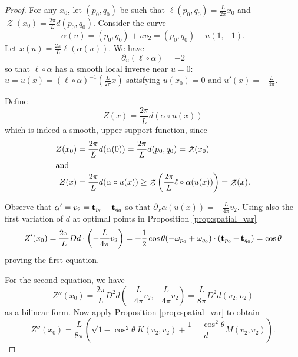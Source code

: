 \documentclass[11pt]{amsart}
\DeclareMathOperator{\chordarcprofile}{\mathcal{Z}}
\begin{document}
\begin{proof}
For any $x_0$, let $(p_0,q_0)$ be such that $\ell(p_0,q_0) = \tfrac{L}{2\pi} x_0$ and $\chordarcprofile(x_0) = \tfrac{2\pi}{L} d(p_0,q_0)$. Consider the curve
\[
\alpha(u) = (p_0, q_0) + uv_2 = (p_0, q_0) + u(1,-1).
\]
Let \(x(u) = \tfrac{2\pi}{L} \ell(\alpha(u))\). We have
\[
\partial_u (\ell \circ \alpha) = -2
\]
so that $\ell\circ\alpha$ has a smooth local inverse near $u=0$: \(u = u(x) = (\ell \circ \alpha)^{-1}(\tfrac{L}{2\pi} x)\) satisfying \(u(x_0) = 0\) and \(u'(x) = -\tfrac{L}{4\pi}\).

Define
\[
Z(x) = \frac{2\pi}{L} d(\alpha \circ u (x))
\]
which is indeed a smooth, upper support function, since
\begin{align*}
Z(x_0) &= \frac{2\pi}{L} d(\alpha(0)) = \frac{2\pi}{L} d(p_0, q_0) = \chordarcprofile(x_0) \\
\intertext{and}
Z(x) &= \frac{2\pi}{L} d(\alpha \circ u(x)) \geq \chordarcprofile \left(\frac{2\pi}{L}\ell\circ\alpha(u(x))\right) = \chordarcprofile(x).
\end{align*}

Observe that $\alpha' = v_2 = \operatorname{\mathbf{t}}_{p_0} - \operatorname{\mathbf{t}}_{q_0}$ so that \(\partial_x \alpha(u(x)) = -\tfrac{L}{4\pi} v_2\). Using also the first variation of $d$ at optimal points in Proposition \ref{prop:spatial_var}
\[
Z'(x_0) = \frac{2\pi}{L} Dd \cdot \left(-\frac{L}{4\pi}v_2\right) = -\frac{1}{2} \cos\theta (-\omega_{p_0} + \omega_{q_0}) \cdot (\operatorname{\mathbf{t}}_{p_0} - \operatorname{\mathbf{t}}_{q_0}) = \cos\theta
\]
proving the first equation.

For the second equation, we have
\[
Z''(x_0) = \frac{2\pi}{L} D^2 d \left(-\frac{L}{4\pi} v_2, -\frac{L}{4\pi} v_2\right) = \frac{L}{8\pi} D^2 d (v_2, v_2)
\]
as a bilinear form. Now apply Proposition \ref{prop:spatial_var} to obtain
\begin{equation}
\label{eq:barrier_secondvar}
Z''(x_0) = \frac{L}{8\pi} \left(\sqrt{1-\cos^2\theta} K (v_2, v_2) + \frac{1-\cos^2\theta}{d} M (v_2, v_2)\right).
\end{equation}


\end{proof}
\end{document}
